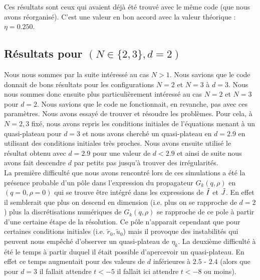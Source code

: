 \documentclass[10.5pt]{article}
\begin{document}
\begin{multicols*}{2}
Ces résultats sont ceux qui avaient déjà été trouvé avec le même code (que nous avons réorganisé). C'est une valeur en bon accord avec la valeur théorique : $\eta = 0.250$.  \\




\subsection{Résultats pour $(N \in \{ 2,3\} , d=2)$}


Nous nous sommes par la suite intéressé au cas $N>1$. Nous savions que le code donnait de bons résultats pour les configurations $N = 2$ et $N=3$ à $d=3$. Nous nous sommes donc ensuite plus particulièrement intéressé au cas $N = 2$ et $N=3$ pour $d = 2$. Nous savions que le code ne fonctionnait, en revanche, pas avec ces paramètres. Nous avons essayé de trouver et résoudre les problèmes. Pour cela, à $N=2,3$ fixé, nous avons repris les conditions initiales de l'équations menant à un quasi-plateau pour $d=3$ et nous avons cherché un quasi-plateau en $d= 2.9$ en utilisant des conditions initiales très proches. Nous avons ensuite utilisé le résultat obtenu avec $d = 2.9$ pour une valeur de $d < 2.9$ et ainsi de suite nous avons fait descendre $d$ par petits pas jusqu'à trouver des irrégularités. \\

 La première difficulté que nous avons rencontré lors de ces simulations a été la présence probable d'un pôle dans l'expression du propagateur $G_k(q, \rho)$ en $(q = 0, \rho = 0)$ qui se trouve être intégré dans les expressions de $\tilde{I}$ et $\tilde{J}$. En effet il semblerait que plus on descend en dimension (i.e. plus on se rapproche de $d=2$) plus la discrétisations numériques de $G_k(q, \rho)$ se rapproche de ce pole à partir d'une certaine étape de la résolution. Ce pôle n'apparait cependant que pour certaines conditions initiales (i.e. $\tilde{r}_0, \tilde{u}_0$) mais il provoque des instabilités qui peuvent nous empêché d'observer un quasi-plateau de $\eta_k$. La deuxième difficulté à été le temps à partir duquel il était possible d'apercevoir un quasi-plateau. En effet ce temps augmentait pour des valeurs de $d$ inférieures à $2.5$ - $2.4$ (alors que pour $d=3$ il fallait attendre $t<-5$ il fallait ici attendre $t<-8$ ou moins). \\
 

\end{multicols*}
\end{document}
